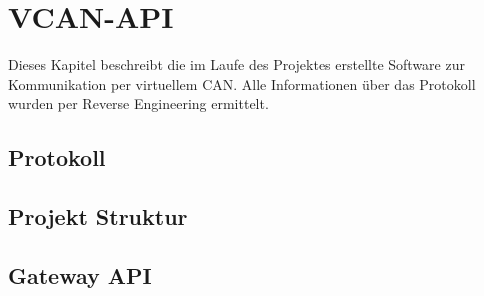 




\chapter{VCAN-API}
\label{sec:vcan_api}
Dieses Kapitel beschreibt die im Laufe des Projektes erstellte Software zur Kommunikation per virtuellem CAN. Alle Informationen über das Protokoll wurden per Reverse Engineering ermittelt.


\section{Protokoll}
\label{sec:vcan_protokoll}



\section{Projekt Struktur}
\label{sec:vcan_struktur}
\begin{description}
\end{description}


\section{Gateway API}
\label{sec:vcan_gateway_api}

